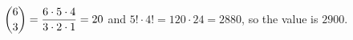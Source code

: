 $\dbinom63=\dfrac{6\cdot5\cdot4}{3\cdot2\cdot1}=20$ and $5!\cdot4!=120\cdot24=2880$, so the value is $\boxed{2900}$.
